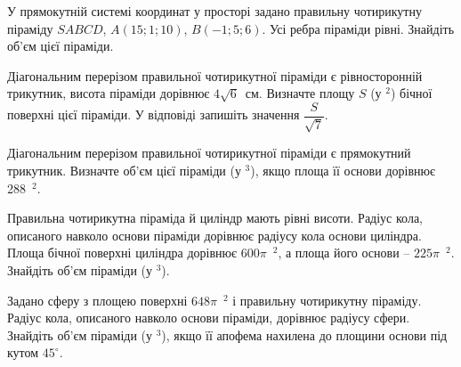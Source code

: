 \documentclass[12pt]{article}
\begin{document}
\begin{samepage}
\noindent\zadnum У прямокутній системі координат у просторі задано правильну чотирикутну піраміду $SABCD$, $A(15; 1; 10)$, $B(-1; 5; 6)$. Усі ребра піраміди рівні. Знайдіть об’єм цієї піраміди. 

\nmtnobreak
\nopagebreak\nbvspace{0.3cm}
\nmtAnswerBox
\par{}
\end{samepage}

\begin{samepage}
\noindent\zadnum Діагональним перерізом правильної чотирикутної піраміди є рівносторонній трикутник, висота піраміди дорівнює $4\sqrt{6}$~см. Визначте площу $S$ (у $^2$) бічної поверхні цієї піраміди. У відповіді запишіть значення $\dfrac{S}{\sqrt{7}}$. 

\nmtnobreak
\nopagebreak\nbvspace{0.5cm}
\nmtAnswerBox
\par{}
\end{samepage}

\begin{samepage}
\noindent\zadnum Діагональним перерізом правильної чотирикутної піраміди є прямокутний трикутник. Визначте об’єм цієї піраміди (у $^3$), якщо площа її основи дорівнює 288~$^2$. 

\nmtnobreak
\nopagebreak\nbvspace{0.5cm}
\nmtAnswerBox
\par{}
\end{samepage}

\begin{samepage}
\noindent\zadnum Правильна чотирикутна піраміда й циліндр мають рівні висоти. Радіус кола, описаного навколо основи піраміди дорівнює радіусу кола основи циліндра. Площа бічної поверхні циліндра дорівнює $600\pi$~$^2$, а площа його основи – $225\pi$~$^2$. Знайдіть об’єм піраміди (у $^3$). 

\nmtnobreak
\nopagebreak\nbvspace{0.5cm}
\nmtAnswerBox
\par{}
\end{samepage}

\begin{samepage}
\noindent\zadnum Задано сферу з площею поверхні $648\pi$~$^2$ і правильну чотирикутну піраміду. Радіус кола, описаного навколо основи піраміди, дорівнює радіусу сфери. Знайдіть об’єм піраміди (у $^3$), якщо її апофема нахилена до площини основи під кутом $45^\circ$. 

\nmtnobreak
\nopagebreak\nbvspace{0.5cm}
\nmtAnswerBox
\par{}
\end{samepage}
\end{document}
